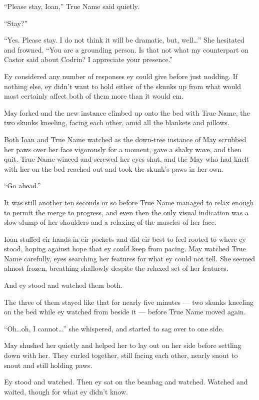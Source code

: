 ``Please stay, Ioan,'' True Name said quietly.

``Stay?''

``Yes. Please stay. I do not think it will be dramatic, but, well\ldots{}'' She hesitated and frowned. ``You are a grounding person. Is that not what my counterpart on Castor said about Codrin? I appreciate your presence.''

Ey considered any number of responses ey could give before just nodding. If nothing else, ey didn't want to hold either of the skunks up from what would most certainly affect both of them more than it would em.

May forked and the new instance climbed up onto the bed with True Name, the two skunks kneeling, facing each other, amid all the blankets and pillows.

Both Ioan and True Name watched as the down-tree instance of May scrubbed her paws over her face vigorously for a moment, gave a shaky wave, and then quit. True Name winced and screwed her eyes shut, and the May who had knelt with her on the bed reached out and took the skunk's paws in her own.

``Go ahead.''

It was still another ten seconds or so before True Name managed to relax enough to permit the merge to progress, and even then the only visual indication was a slow slump of her shoulders and a relaxing of the muscles of her face.

Ioan stuffed eir hands in eir pockets and did eir best to feel rooted to where ey stood, hoping against hope that ey could keep from pacing. May watched True Name carefully, eyes searching her features for what ey could not tell. She seemed almost frozen, breathing shallowly despite the relaxed set of her features.

And ey stood and watched them both.

The three of them stayed like that for nearly five minutes — two skunks kneeling on the bed while ey watched from beside it — before True Name moved again.

``Oh\ldots oh, I cannot\ldots{}'' she whispered, and started to sag over to one side.

May shushed her quietly and helped her to lay out on her side before settling down with her. They curled together, still facing each other, nearly snout to snout and still holding paws.

Ey stood and watched. Then ey sat on the beanbag and watched. Watched and waited, though for what ey didn't know.

